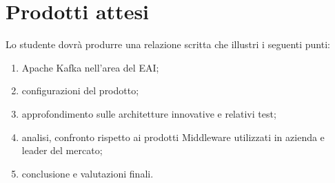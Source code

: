 \section*{Prodotti attesi}
Lo studente dovrà produrre una relazione scritta che illustri i seguenti punti:
\begin{enumerate}
    \item Apache Kafka nell'area del EAI;
    \item configurazioni del prodotto;
    \item approfondimento sulle architetture innovative e relativi test;
    \item analisi, confronto rispetto ai prodotti Middleware utilizzati in azienda e leader del mercato;
    \item conclusione e valutazioni finali.
\end{enumerate}
